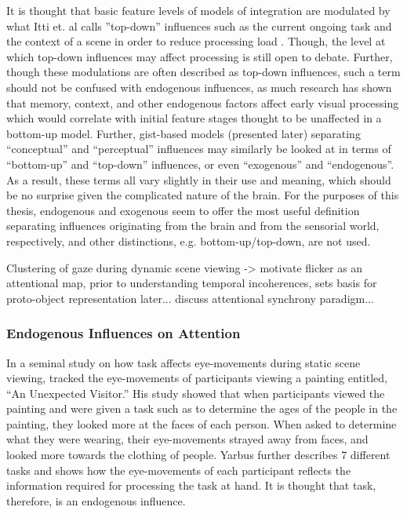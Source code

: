 \documentclass[a4paper,10pt,final]{ThesisStyle}
\begin{document}
It is thought that basic feature levels of models of integration are modulated by what Itti et. al calls ''top-down'' influences \cite{Itti2001} such as the current ongoing task \cite{Yarbus1967,Smith2011a} and the context of a scene in order to reduce processing load \cite{Henderson2003,Torralba2006}.  Though, the level at which top-down influences may affect processing is still open to debate.  Further, though these modulations are often described as top-down influences, such a term should not be confused with endogenous influences, as much research has shown that memory, context, and other endogenous factors affect early visual processing \cite{Tatler2011} which would correlate with initial feature stages thought to be unaffected in a bottom-up model.  Further, gist-based models (presented later) separating ``conceptual'' and ``perceptual'' influences may similarly be looked at in terms of ``bottom-up'' and ``top-down'' influences, or even ``exogenous'' and ``endogenous''.  As a result, these terms all vary slightly in their use and meaning, which should be no surprise given the complicated nature of the brain.  For the purposes of this thesis, endogenous and exogenous seem to offer the most useful definition separating influences originating from the brain and from the sensorial world, respectively, and other distinctions, e.g. bottom-up/top-down, are not used. 

Clustering of gaze during dynamic scene viewing -> motivate flicker as an attentional map, prior to understanding temporal incoherences, sets basis for proto-object representation later... discuss attentional synchrony paradigm... 
  	
\subsubsection{Endogenous Influences on Attention}
\label{sec:endogenous-influences}

In a seminal study on how task affects eye-movements during static scene viewing, \cite{Yarbus1967} tracked the eye-movements of participants viewing a painting entitled, ``An Unexpected Visitor.''  His study showed that when participants viewed the painting and were given a task such as to determine the ages of the people in the painting, they looked more at the faces of each person.  When asked to determine what they were wearing, their eye-movements strayed away from faces, and looked more towards the clothing of people.  Yarbus further describes 7 different tasks and shows how the eye-movements of each participant reflects the information required for processing the task at hand.  It is thought that task, therefore, is an endogenous influence.
\end{document}
